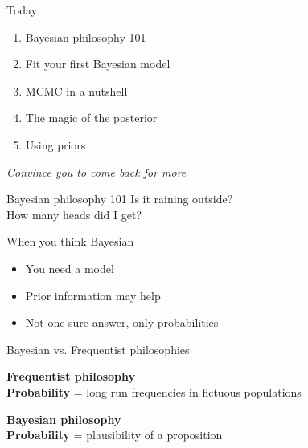 \documentclass[10pt]{beamer}\usepackage[]{graphicx}\usepackage[]{color}
\begin{document}
\begin{frame}{Today}
\large
  \begin{enumerate}
    \item Bayesian philosophy 101
    \item Fit your first Bayesian model
    \item MCMC in a nutshell
    \item The magic of the posterior
    \item Using priors
  \end{enumerate}
\pause
\textit{Convince you to come back for more}
\end{frame}


\begin{frame}{Bayesian philosophy 101}
  \centering \large{Is it raining outside?\\}
  \pause
  \centering \large{How many heads did I get?}
  \pause
  \begin{alertblock}{When you think Bayesian}
    \begin{itemize}
      \item You need a model
      \item Prior information may help
      \item Not one sure answer, only probabilities
    \end{itemize}
  \end{alertblock}
\end{frame}

\begin{frame}{Bayesian vs. Frequentist philosophies}

\textbf{\large Frequentist philosophy\\}
\textbf{Probability} = long run frequencies in fictuous populations\\

\bigskip

\textbf{\large Bayesian philosophy\\}
\textbf{Probability} = plausibility of a proposition \\
\bigskip
{}
\end{frame}
\end{document}

